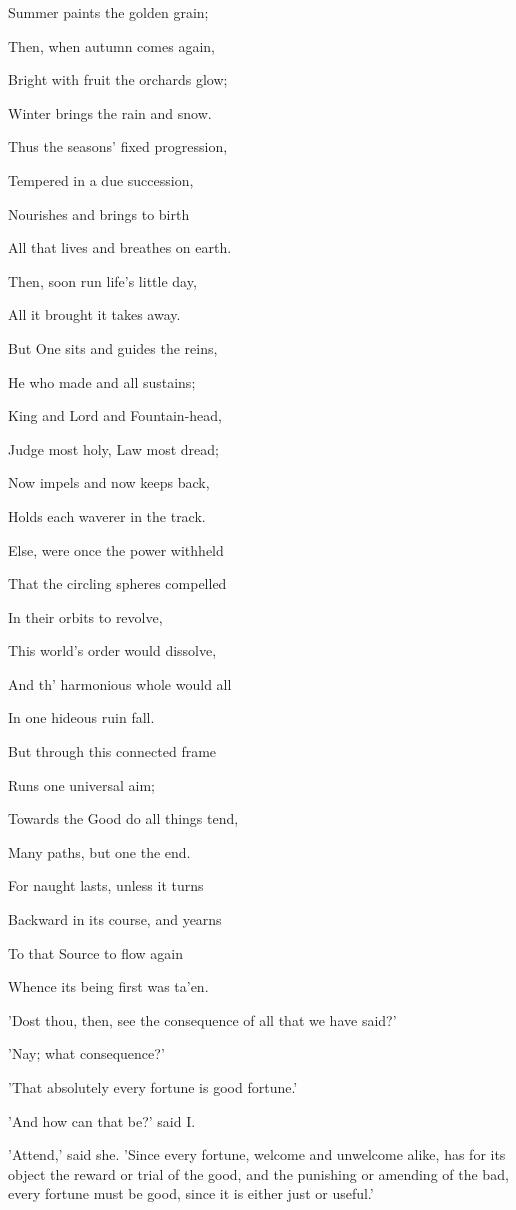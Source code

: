 Summer paints the golden grain;

Then, when autumn comes again,

Bright with fruit the orchards glow;

Winter brings the rain and snow.

Thus the seasons' fixed progression,

Tempered in a due succession,

Nourishes and brings to birth

All that lives and breathes on earth.

Then, soon run life's little day,

All it brought it takes away.

But One sits and guides the reins,

He who made and all sustains;

King and Lord and Fountain-head,

Judge most holy, Law most dread;

Now impels and now keeps back,

Holds each waverer in the track.

Else, were once the power withheld

That the circling spheres compelled

In their orbits to revolve,

This world's order would dissolve,

And th' harmonious whole would all

In one hideous ruin fall.

But through this connected frame

Runs one universal aim;

Towards the Good do all things tend,

Many paths, but one the end.

For naught lasts, unless it turns

Backward in its course, and yearns

To that Source to flow again

Whence its being first was ta'en.


'Dost thou, then, see the consequence of all that we have said?'

'Nay; what consequence?'

'That absolutely every fortune is good fortune.'

'And how can that be?' said I.

'Attend,' said she. 'Since every fortune, welcome and unwelcome alike,
has for its object the reward or trial of the good, and the punishing or
amending of the bad, every fortune must be good, since it is either just
or useful.'

